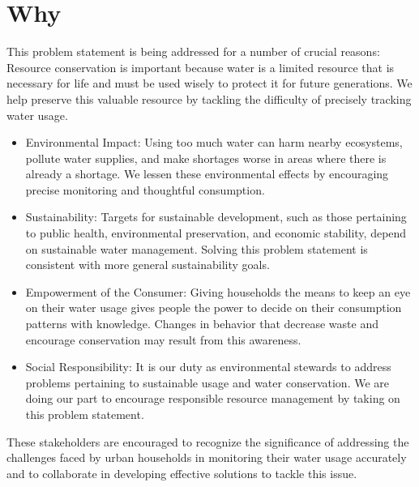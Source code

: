 \section{Why}
This problem statement is being addressed for a number of crucial reasons:
Resource conservation is important because water is a limited resource that is necessary for life and must be used wisely to protect it for future generations. We help preserve this valuable resource by tackling the difficulty of precisely tracking water usage.
\begin{itemize}
	\item Environmental Impact: Using too much water can harm nearby ecosystems, pollute water supplies, and make shortages worse in areas where there is already a shortage. We lessen these environmental effects by encouraging precise monitoring and thoughtful consumption.
	\item Sustainability: Targets for sustainable development, such as those pertaining to public health, environmental preservation, and economic stability, depend on sustainable water management. Solving this problem statement is consistent with more general sustainability goals.
	\item Empowerment of the Consumer: Giving households the means to keep an eye on their water usage gives people the power to decide on their consumption patterns with knowledge. Changes in behavior that decrease waste and encourage conservation may result from this awareness.
	\item Social Responsibility: It is our duty as environmental stewards to address problems pertaining to sustainable usage and water conservation. We are doing our part to encourage responsible resource management by taking on this problem statement.
	
\end{itemize}
These stakeholders are encouraged to recognize the significance of addressing the challenges faced by urban households in monitoring their water usage accurately and to collaborate in developing effective solutions to tackle this issue.
